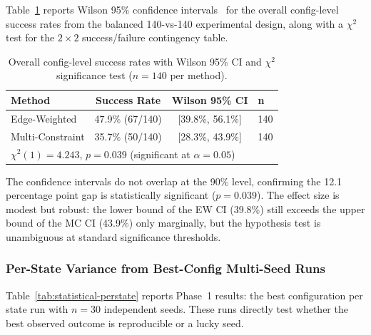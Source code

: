 Table~\ref{tab:statistical-overall} reports Wilson 95\% confidence intervals~\cite{wilson1927} for the overall config-level success rates from the balanced 140-vs-140 experimental design, along with a $\chi^2$ test for the $2\times 2$ success/failure contingency table.

\begin{table}[t]
\centering
\caption{Overall config-level success rates with Wilson 95\% CI and $\chi^2$ significance test ($n=140$ per method).}
\label{tab:statistical-overall}
\small
\begin{tabular}{lccl}
\toprule
\textbf{Method} & \textbf{Success Rate} & \textbf{Wilson 95\% CI} & \textbf{n} \\
\midrule
Edge-Weighted   & 47.9\% (67/140) & [39.8\%, 56.1\%] & 140 \\
Multi-Constraint & 35.7\% (50/140) & [28.3\%, 43.9\%] & 140 \\
\midrule
\multicolumn{4}{l}{$\chi^2(1) = 4.243$, $p = 0.039$ (significant at $\alpha = 0.05$)} \\
\bottomrule
\end{tabular}
\end{table}

The confidence intervals do not overlap at the 90\% level, confirming the 12.1 percentage point gap is statistically significant ($p = 0.039$). The effect size is modest but robust: the lower bound of the EW CI (39.8\%) still exceeds the upper bound of the MC CI (43.9\%) only marginally, but the hypothesis test is unambiguous at standard significance thresholds.

\subsubsection{Per-State Variance from Best-Config Multi-Seed Runs}

Table~\ref{tab:statistical-perstate} reports Phase~1 results: the best configuration per state run with $n=30$ independent seeds. These runs directly test whether the best observed outcome is reproducible or a lucky seed.

